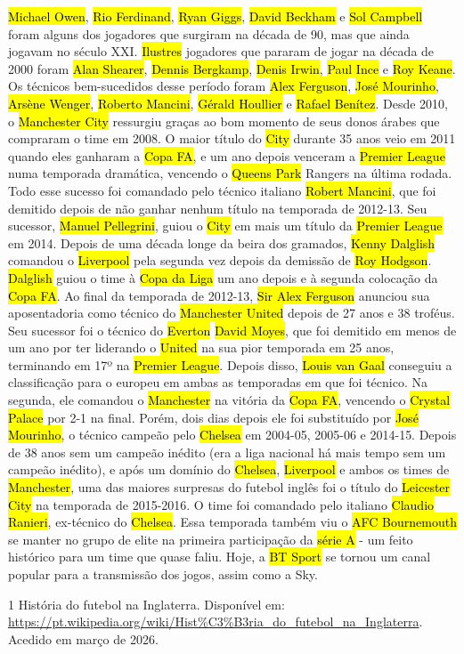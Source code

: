 \documentclass[a4paper,12pt]{article}
\begin{document}
\hl{Michael Owen}, \hl{Rio Ferdinand}, \hl{Ryan Giggs}, \hl{David Beckham} e \hl{Sol Campbell} foram alguns dos jogadores que surgiram na década de 90, mas que ainda jogavam no século XXI. \hl{Ilustres} jogadores que pararam de jogar na década de 2000 foram \hl{Alan Shearer}, \hl{Dennis Bergkamp}, \hl{Denis Irwin}, \hl{Paul Ince} e \hl{Roy Keane}. Os técnicos bem-sucedidos desse período foram \hl{Alex Ferguson}, \hl{José Mourinho}, \hl{Arsène Wenger}, \hl{Roberto Mancini}, \hl{Gérald Houllier} e \hl{Rafael Benítez}.
Desde 2010, o \hl{Manchester City} ressurgiu graças ao bom momento de seus donos árabes que compraram o time em 2008. O maior título do \hl{City} durante 35 anos veio em 2011 quando eles ganharam a \hl{Copa FA}, e um ano depois venceram a \hl{Premier League} numa temporada dramática, vencendo o \hl{Queens Park} Rangers na última rodada. Todo esse sucesso foi comandado pelo técnico italiano \hl{Robert Mancini}, que foi demitido depois de não ganhar nenhum título na temporada de 2012-13. Seu sucessor, \hl{Manuel Pellegrini}, guiou o \hl{City} em mais um título da \hl{Premier League} em 2014.
Depois de uma década longe da beira dos gramados, \hl{Kenny Dalglish} comandou o \hl{Liverpool} pela segunda vez depois da demissão de \hl{Roy Hodgson}. \hl{Dalglish} guiou o time à \hl{Copa da Liga} um ano depois e à segunda colocação da \hl{Copa FA}.
Ao final da temporada de 2012-13, \hl{Sir Alex Ferguson} anunciou sua aposentadoria como técnico do \hl{Manchester United} depois de 27 anos e 38 troféus. Seu sucessor foi o técnico do \hl{Everton} \hl{David Moyes}, que foi demitido em menos de um ano por ter liderando o \hl{United} na sua pior temporada em 25 anos, terminando em 17º na \hl{Premier League}. Depois disso, \hl{Louis van Gaal} conseguiu a classificação para o europeu em ambas as temporadas em que foi técnico. Na segunda, ele comandou o \hl{Manchester} na vitória da \hl{Copa FA}, vencendo o \hl{Crystal Palace} por 2-1 na final. Porém, dois dias depois ele foi substituído por \hl{José Mourinho}, o técnico campeão pelo \hl{Chelsea} em 2004-05, 2005-06 e 2014-15.
Depois de 38 anos sem um campeão inédito (era a liga nacional há mais tempo sem um campeão inédito), e após um domínio do \hl{Chelsea}, \hl{Liverpool} e ambos os times de \hl{Manchester}, uma das maiores surpresas do futebol inglês foi o título do \hl{Leicester City} na temporada de 2015-2016. O time foi comandado pelo italiano \hl{Claudio Ranieri}, ex-técnico do \hl{Chelsea}. Essa temporada também viu o \hl{AFC Bournemouth} se manter no grupo de elite na primeira participação da \hl{série A} - um feito histórico para um time que quase faliu. Hoje, a \hl{BT Sport} se tornou um canal popular para a transmissão dos jogos, assim como a Sky.


\begin{thebibliography}{1}
  História do futebol na Inglaterra.
  Disponível em: \url{https://pt.wikipedia.org/wiki/Hist\%C3\%B3ria\_do\_futebol\_na\_Inglaterra}.
  Acedido em março de 2026.
\end{thebibliography}
\end{document}
